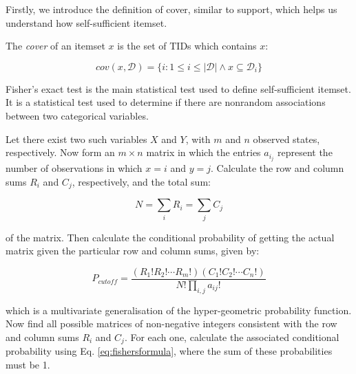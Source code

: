 Firstly, we introduce the definition of cover, similar to support, which helps us understand how self-sufficient itemset.

\begin{definition}
\label{df:cover}
The \textit{cover} of an itemset $x$ is the set of TIDs which contains $x$:
\end{definition}

\begin{equation}
\label{eq:cover}
cov(x, \mathcal{D}) = \{i: 1\leq i\leq |\mathcal{D}| \wedge x \subseteq \mathcal{D}_i\}
\end{equation}

\begin{definition}
\label{df:fishers}
Fisher's exact test is the main statistical test used to define self-sufficient itemset. It is a statistical test used to determine if there are nonrandom associations between two categorical variables.

Let there exist two such variables $X$ and $Y$, with $m$ and $n$ observed states, respectively. Now form an $m\times n$ matrix in which the entries $a_i_j$ represent the number of observations in which $x = i$ and $y = j$. Calculate the row and column sums $R_i$ and $C_j$, respectively, and the total sum: 

\begin{equation}
\label{eq:fisherssum}
N = \sum_{i} R_i = \sum_{j} C_j
\end{equation}

of the matrix. Then calculate the conditional probability of getting the actual matrix given the particular row and column sums, given by:

\begin{equation}
\label{eq:fishersformula}
P_{cutoff}=\frac{(R_1! R_2! \cdots R_m!)(C_1! C_2! \cdots C_n!)}{N!\prod_{i,j} a_{ij}!}
\end{equation}

which is a multivariate generalisation of the hyper-geometric probability function. Now find all possible matrices of non-negative integers consistent with the row and column sums $R_i$ and $C_j$. For each one, calculate the associated conditional probability using Eq. \ref{eq:fishersformula}, where the sum of these probabilities must be 1.
\end{definition}


